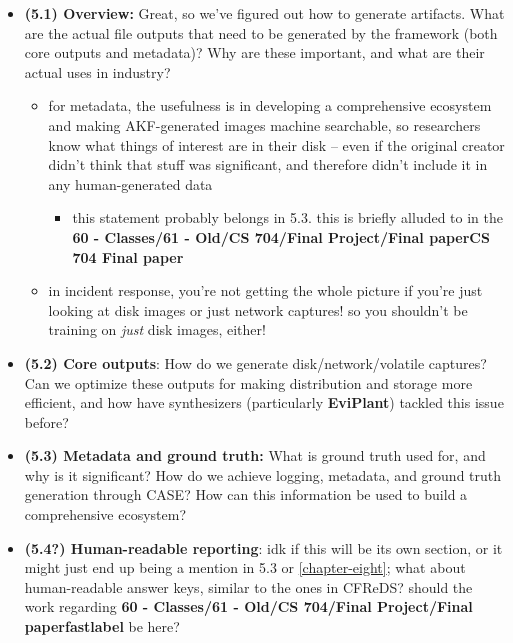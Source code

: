 \begin{itemize}
\tightlist
\item
  \textbf{(5.1) Overview:} Great, so we've figured out how to generate
  artifacts. What are the actual file outputs that need to be generated
  by the framework (both core outputs and metadata)? Why are these
  important, and what are their actual uses in industry?

  \begin{itemize}
  \tightlist
  \item
    for metadata, the usefulness is in developing a comprehensive
    ecosystem and making AKF-generated images machine searchable, so
    researchers know what things of interest are in their disk -- even
    if the original creator didn't think that stuff was significant, and
    therefore didn't include it in any human-generated data

    \begin{itemize}
    \tightlist
    \item
      this statement probably belongs in 5.3. this is briefly alluded to
      in the \textbf{60 - Classes/61 - Old/CS 704/Final Project/Final
      paper\textbar CS 704 Final paper}
    \end{itemize}
  \item
    in incident response, you're not getting the whole picture if you're
    just looking at disk images or just network captures! so you
    shouldn't be training on \emph{just} disk images, either!
  \end{itemize}
\item
  \textbf{(5.2) Core outputs}: How do we generate disk/network/volatile
  captures? Can we optimize these outputs for making distribution and
  storage more efficient, and how have synthesizers (particularly
  \textbf{EviPlant}) tackled this issue before?
\item
  \textbf{(5.3) Metadata and ground truth:} What is ground truth used
  for, and why is it significant? How do we achieve logging, metadata,
  and ground truth generation through CASE? How can this information be
  used to build a comprehensive ecosystem?
\item
  \textbf{(5.4?) Human-readable reporting}: idk if this will be its own
  section, or it might just end up being a mention in 5.3 or
  \autoref{chapter-eight}; what about human-readable answer keys,
  similar to the ones in CFReDS? should the work regarding \textbf{60 -
  Classes/61 - Old/CS 704/Final Project/Final paper\textbar fastlabel}
  be here?
\end{itemize}


